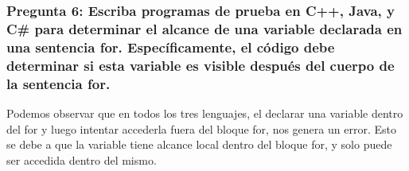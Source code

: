 \subsubsection{Pregunta 6: Escriba programas de prueba en C++, Java, y C\# para determinar el alcance de una variable declarada en una sentencia for. Específicamente, el código debe determinar si esta variable es visible después del cuerpo de la sentencia for.}







Podemos observar que en todos los tres lenguajes, el declarar una variable dentro del for y luego intentar accederla fuera del bloque for, nos genera un error. Esto se debe a que la variable tiene alcance local dentro del bloque for, y solo puede ser accedida dentro del mismo.
